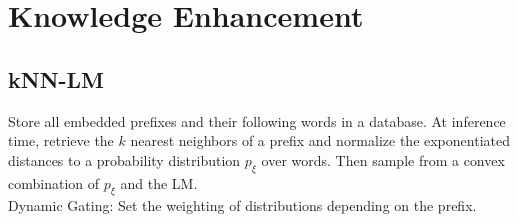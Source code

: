 \section{Knowledge Enhancement}
\subsection*{kNN-LM}
Store all embedded prefixes and their following words in a database. At inference time, retrieve the $k$ nearest neighbors of a prefix and normalize the exponentiated distances to a probability distribution $p_\xi$ over words. Then sample from a convex combination of $p_\xi$ and the LM.\\
Dynamic Gating: Set the weighting of distributions depending on the prefix.